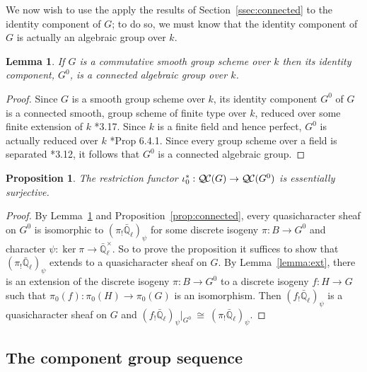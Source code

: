 \documentclass[CM,Submssn,SecEq]{degruyter-crelle} %
\theoremstyle{plain}
\newtheorem{proposition}[theorem]{Proposition}
\newtheorem{lemma}[theorem]{Lemma}
\theoremstyle{definition}
\theoremstyle{remark}
\newcommand{\EE}{\mathbb{\bar Q}_\ell}
\newcommand{\Fq}{k}
\newcommand{\EEx}{\EE^\times}
\newcommand{\iso}{{\ \cong\ }}
\newcommand{\qcs}[1]{{\mathcal{#1}}}
\newcommand{\QC}{{\mathcal{Q\hskip-0.8pt C}}}
\begin{document}
We now wish to use the apply the results of Section~\ref{ssec:connected} to the identity component of $G$; to do so, we must know that the identity component of $G$ is actually an algebraic group over $\Fq$.

\begin{lemma} \label{lem:G0alg-grp}
If $G$ is a commutative smooth group scheme over $\Fq$ then its identity component, $G^0$, is a connected algebraic group over $\Fq$.
\end{lemma}
\begin{proof}
 Since $G$ is a smooth group scheme over $\Fq$, its
 identity component $G^0$ of $G$ is a connected smooth,
 group scheme of finite type over $\Fq$, reduced over some finite extension of $\Fq$
 \cite{vdGeer-Moonen:AbelianVarieties}*{3.17}.
 Since $\Fq$ is a finite field and hence perfect, $G^0$ is actually reduced over $\Fq$
 \cite{EGAIV2}*{Prop 6.4.1}.  Since every group scheme over a field is separated
 \cite{vdGeer-Moonen:AbelianVarieties}*{3.12},
 it follows that $G^0$ is a connected algebraic group.
\end{proof}

\begin{proposition}\label{prop:restriction}
The restriction functor $\iota_0^* : \QC(G)\to \QC(G^0)$ is essentially surjective.
\end{proposition}

\begin{proof}
  By Lemma~\ref{lem:G0alg-grp} and Proposition~\ref{prop:connected}, every
  quasicharacter sheaf on $G^0$ is isomorphic to $(\pi_! \EE)_\psi$ for some discrete isogeny $\pi : B \to G^0$ and character $\psi : \ker \pi \to \EEx$.
  So to prove the proposition it suffices to show that $(\pi_! \EE)_\psi$ extends to a quasicharacter sheaf on $G$.
%
 By Lemma~\ref{lemma:ext}, there is an extension of the
 discrete isogeny $\pi : B \to G^0$ to a discrete isogeny $f : H \to G$
 such that $\pi_0(f) : \pi_0(H)\to \pi_0(G)$ is an isomorphism.
 Then $(f_! \EE)_\psi$ is a quasicharacter sheaf on $G$ and
 $(f_! \EE)_\psi\vert_{G^0} \iso (\pi_! \EE)_\psi$.
\end{proof}

\subsection{The component group sequence} \label{ssec:component}
\end{document}
